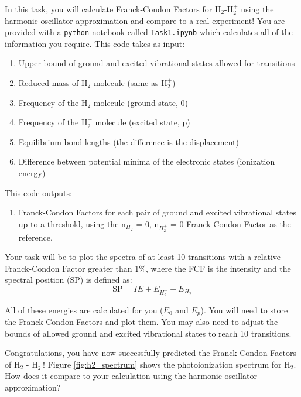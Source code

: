 \documentclass[12pt]{article}
\begin{document}
In this task, you will calculate Franck-Condon Factors for H$_2$-H$_2^+$ using the harmonic oscillator approximation and compare to a real experiment!
You are provided with a \texttt{python} notebook called \texttt{Task1.ipynb} which calculates all of the information you require. This code takes as input:
\begin{enumerate}
    \item Upper bound of ground and excited vibrational states allowed for transitions
    \item Reduced mass of H$_2$ molecule (same as H$_2^+$)
    \item Frequency of the H$_2$ molecule  (ground state, 0)
    \item Frequency of the H$_2^+$ molecule (excited state, p)
    \item Equilibrium bond lengths (the difference is the displacement)
    \item Difference between potential minima of the electronic states (ionization energy)
\end{enumerate}
This code outputs:
\begin{enumerate}
    \item Franck-Condon Factors for each pair of ground and excited vibrational states up to a threshold, using the n$_{H_2}$ = 0, n$_{H_2^+}$ = 0 Franck-Condon Factor as the reference.
\end{enumerate}
Your task will be to plot the spectra of at least 10 transitions with a relative Franck-Condon Factor greater than 1\%, where the FCF is the intensity and the spectral position (SP) is defined as:
\begin{equation}
    \text{SP} = IE + E_{H_2^+} - E_{H_2}
\end{equation}

\noindent All of these energies are calculated for you ($E_0$ and $E_p$). You will need to store the Franck-Condon Factors and plot them. You may also need to adjust the bounds of allowed ground and excited vibrational states to reach 10 transitions. 

Congratulations, you have now successfully predicted the Franck-Condon Factors of H$_2$ - H$_2^+$! Figure \ref{fig:h2_spectrum} shows the photoionization spectrum for H$_2$. How does it compare to your calculation using the harmonic oscillator approximation?
\end{document}
